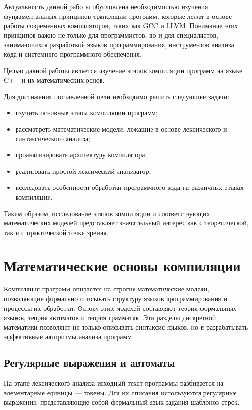 \documentclass[coursework]{SCWorks}
\begin{document}
Актуальность данной работы обусловлена необходимостью изучения фундаментальных принципов трансляции программ, 
которые лежат в основе работы современных компиляторов, таких как GCC и LLVM. 
Понимание этих принципов важно не только для программистов, но и для специалистов, занимающихся разработкой 
языков программирования, инструментов анализа кода и системного программного обеспечения.

Целью данной работы является изучение этапов компиляции программ на языке C++ и их математических основ.

Для достижения поставленной цели необходимо решить следующие задачи:
\begin{itemize}
    \item изучить основные этапы компиляции программ;
    \item рассмотреть математические модели, лежащие в основе лексического и синтаксического анализа;
    \item проанализировать архитектуру компилятора;
    \item реализовать простой лексический анализатор;
    \item исследовать особенности обработки программного кода на различных этапах компиляции.
\end{itemize}

Таким образом, исследование этапов компиляции и соответствующих математических моделей 
представляет значительный интерес как с теоретической, так и с практической точки зрения.

\section{Математические основы компиляции}

Компиляция программ опирается на строгие математические модели, позволяющие формально описывать 
структуру языков программирования и процессы их обработки. Основу этих моделей составляют теория 
формальных языков, теория автоматов и теория грамматик. Эти разделы дискретной математики позволяют 
не только описывать синтаксис языков, но и разрабатывать эффективные алгоритмы анализа программ.

\subsection{Регулярные выражения и автоматы}

На этапе лексического анализа исходный текст программы разбивается на элементарные единицы — токены. 
Для их описания используются регулярные выражения, представляющие собой формальный язык задания шаблонов строк.
\end{document}
